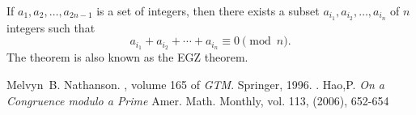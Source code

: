 \documentclass[12pt]{article}
\begin{document}
If $a_1, a_2,\dotsc, a_{2n-1}$ is a set of integers, then there exists a subset $a_{i_1}, a_{i_2},\dotsc,a_{i_n}$ of $n$ integers such that
\begin{equation*}
a_{i_1}+ a_{i_2}+\dotsb+a_{i_n}\equiv 0 \pmod n.
\end{equation*}
The theorem is also known as the EGZ theorem.

\begin{thebibliography}{1}

Melvyn~B. Nathanson.
, volume 165 of {\em GTM}.
\newblock Springer, 1996.
\newblock {}.
\newblock Hao,P. {\em On a Congruence modulo a Prime}
\newblock Amer. Math. Monthly, vol. 113, (2006), 652-654

\end{thebibliography}

%
\end{document}
